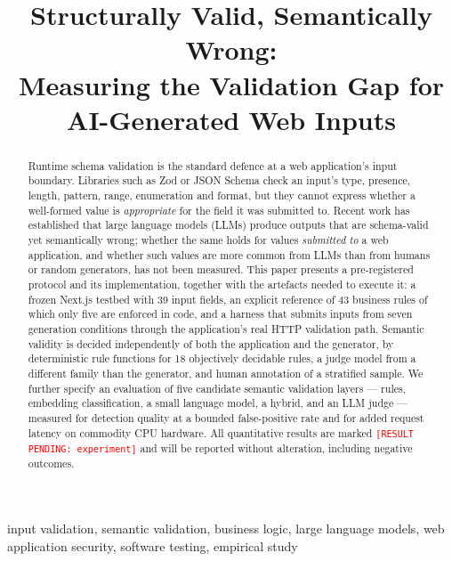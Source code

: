 \documentclass[conference]{IEEEtran}
\newcommand{\pending}[1]{\textcolor{red}{\texttt{[RESULT PENDING: #1]}}}
\begin{document}
\title{Structurally Valid, Semantically Wrong:\\Measuring the Validation Gap for AI-Generated Web Inputs}

\author{
}

\maketitle

\begin{abstract}
Runtime schema validation is the standard defence at a web application's input boundary. Libraries
such as Zod or JSON Schema check an input's type, presence, length, pattern, range, enumeration and
format, but they cannot express whether a well-formed value is \emph{appropriate} for the field it
was submitted to. Recent work has established that large language models (LLMs) produce outputs that
are schema-valid yet semantically wrong; whether the same holds for values \emph{submitted to} a web
application, and whether such values are more common from LLMs than from humans or random
generators, has not been measured. This paper presents a pre-registered protocol and its
implementation, together with the artefacts needed to execute it: a frozen Next.js testbed with 39
input fields, an explicit reference of 43 business rules of which only five are enforced in code, and
a harness that submits inputs from seven generation conditions through the application's real HTTP
validation path. Semantic validity is decided independently of both the application and the
generator, by deterministic rule functions for 18 objectively decidable rules, a judge model from a
different family than the generator, and human annotation of a stratified sample. We further specify
an evaluation of five candidate semantic validation layers --- rules, embedding classification, a
small language model, a hybrid, and an LLM judge --- measured for detection quality at a bounded
false-positive rate and for added request latency on commodity CPU hardware. All quantitative
results are marked \pending{experiment} and will be reported without alteration, including negative
outcomes.
\end{abstract}

\begin{IEEEkeywords}
input validation, semantic validation, business logic, large language models, web application
security, software testing, empirical study
\end{IEEEkeywords}
\end{document}
